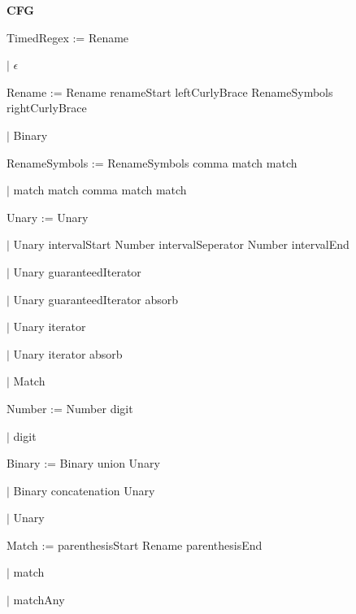 
\textbf{CFG}

TimedRegex := Rename

\qquad	$\mid$ $\epsilon$

Rename := Rename renameStart leftCurlyBrace RenameSymbols rightCurlyBrace

\qquad $\mid$ Binary

RenameSymbols := RenameSymbols comma match match

\qquad $\mid$ match match comma match match

Unary := Unary

\qquad $\mid$ Unary intervalStart Number intervalSeperator Number intervalEnd

\qquad $\mid$ Unary guaranteedIterator

\qquad $\mid$ Unary guaranteedIterator absorb

\qquad $\mid$ Unary iterator

\qquad $\mid$ Unary iterator absorb

\qquad $\mid$ Match

Number := Number digit

\qquad $\mid$ digit

Binary := Binary union Unary

\qquad $\mid$ Binary concatenation Unary

\qquad $\mid$ Unary

Match := parenthesisStart Rename parenthesisEnd

\qquad $\mid$ match

\qquad $\mid$ matchAny

